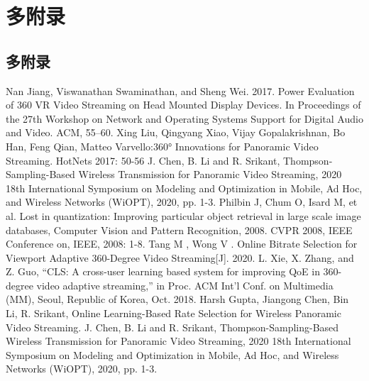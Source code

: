 \chapter{多附录}

\section{多附录}
\begin{thebibliography}{4}  
	Nan Jiang, Viswanathan Swaminathan, and Sheng Wei. 2017. Power Evaluation of 360 VR Video Streaming on Head Mounted Display Devices. In Proceedings of the 27th Workshop on Network and Operating Systems Support for Digital Audio and Video. ACM, 55–60.
	Xing Liu, Qingyang Xiao, Vijay Gopalakrishnan, Bo Han, Feng Qian, Matteo Varvello:360° Innovations for Panoramic Video Streaming. HotNets 2017: 50-56
	J. Chen, B. Li and R. Srikant, Thompson-Sampling-Based Wireless Transmission for Panoramic Video Streaming, 2020 18th International Symposium on Modeling and Optimization in Mobile, Ad Hoc, and Wireless Networks (WiOPT), 2020, pp. 1-3.
	Philbin J, Chum O, Isard M, et al. Lost in quantization: Improving particular object retrieval in large scale image databases, Computer Vision and Pattern Recognition, 2008. CVPR 2008, IEEE Conference on, IEEE, 2008: 1-8.  
	Tang M ,  Wong V . Online Bitrate Selection for Viewport Adaptive 360-Degree Video Streaming[J].  2020.
	L. Xie, X. Zhang, and Z. Guo, “CLS: A cross-user learning based system for improving QoE in 360-degree video adaptive streaming,” in Proc. ACM Int’l Conf. on Multimedia (MM), Seoul, Republic of Korea, Oct. 2018.
	Harsh Gupta, Jiangong Chen, Bin Li, R. Srikant, Online Learning-Based Rate Selection for Wireless Panoramic Video Streaming.
	J. Chen, B. Li and R. Srikant, Thompson-Sampling-Based Wireless Transmission for Panoramic Video Streaming, 2020 18th International Symposium on Modeling and Optimization in Mobile, Ad Hoc, and Wireless Networks (WiOPT), 2020, pp. 1-3.
\end{thebibliography}

\endinput
